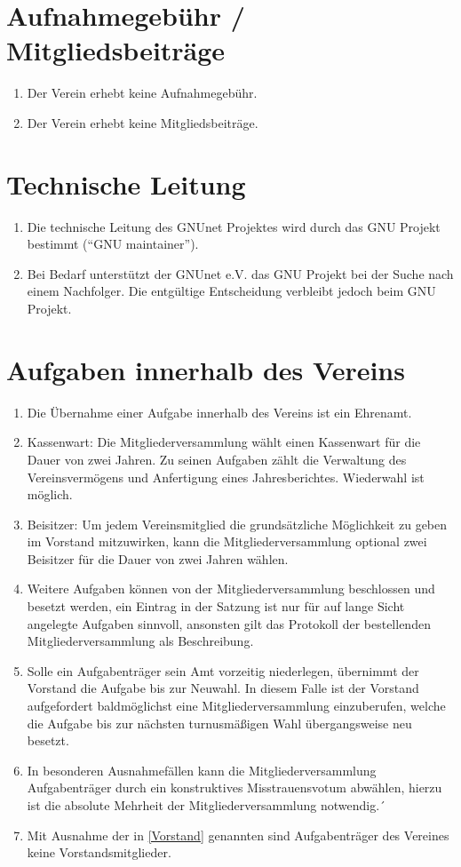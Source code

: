 \documentclass[german,a4paper]{article} %
\newenvironment{enumpar}{%
  \renewcommand{\labelenumi}{\theenumi}%
  \renewcommand{\theenumi}{(\arabic{enumi})}%
  \renewcommand{\labelenumii}{\theenumii}%
  \renewcommand{\theenumii}{(\alph{enumii})}%
  \begin{enumerate}}
{\end{enumerate}}
\begin{document}
\section{Aufnahmegebühr / Mitgliedsbeiträge}
\begin{enumpar}
\item Der Verein erhebt keine Aufnahmegebühr.
\item Der Verein erhebt keine Mitgliedsbeiträge.
\end{enumpar}

\section{Technische Leitung}\label{sec:tl}
\begin{enumpar}
\item Die technische Leitung des GNUnet Projektes wird durch das GNU Projekt bestimmt (``GNU maintainer'').
\item Bei Bedarf unterst\"utzt der GNUnet e.V. das GNU Projekt bei der Suche nach einem Nachfolger.  Die entg\"ultige Entscheidung verbleibt jedoch beim GNU Projekt.
\end{enumpar}

\section{Aufgaben innerhalb des Vereins}
\label{Aufgaben}
\begin{enumpar}
\item Die Übernahme einer Aufgabe innerhalb des Vereins ist ein Ehrenamt.
\item \label{Kassenwart}Kassenwart: Die Mitgliederversammlung wählt einen Kassenwart für die Dauer von zwei Jahren. Zu seinen Aufgaben zählt die Verwaltung des Vereinsvermögens und Anfertigung eines Jahresberichtes. Wiederwahl ist möglich.
\item Beisitzer: Um jedem Vereinsmitglied die grundsätzliche Möglichkeit zu geben im Vorstand mitzuwirken, kann die Mitgliederversammlung optional zwei Beisitzer für die Dauer von zwei Jahren w\"ahlen.
\item Weitere Aufgaben können von der Mitgliederversammlung beschlossen und besetzt werden, ein Eintrag in der Satzung ist nur für auf lange Sicht angelegte Aufgaben sinnvoll, ansonsten gilt das Protokoll der bestellenden Mitgliederversammlung als Beschreibung.
\item Solle ein Aufgabenträger sein Amt vorzeitig niederlegen, übernimmt der Vorstand die Aufgabe bis zur Neuwahl. In diesem Falle ist der Vorstand aufgefordert baldmöglichst eine Mitgliederversammlung einzuberufen, welche die Aufgabe bis zur nächsten turnusmäßigen Wahl übergangsweise neu besetzt.
\item In besonderen Ausnahmefällen kann die Mitgliederversammlung Aufgabenträger durch ein konstruktives Misstrauensvotum abwählen, hierzu ist die absolute Mehrheit der Mitgliederversammlung notwendig.´
\item Mit Ausnahme der in \ref{Vorstand} genannten sind Aufgabenträger des Vereines keine Vorstandsmitglieder.
\end{enumpar}
\end{document}
